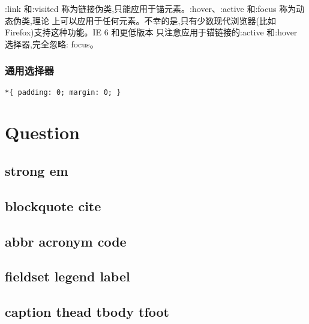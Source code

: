 \documentclass[11pt]{article}
\begin{document}
:link 和:visited 称为链接伪类,只能应用于锚元素。:hover、:active 和:focus 称为动态伪类,理论
上可以应用于任何元素。不幸的是,只有少数现代浏览器(比如 Firefox)支持这种功能。IE 6 和更低版本
只注意应用于锚链接的:active 和:hover 选择器,完全忽略: focus。
\subsubsection{通用选择器}
\label{sec-4.1.5}


\begin{verbatim}
*{ padding: 0; margin: 0; }

\end{verbatim}




\section{Question}
\label{sec-5}

\subsection{strong em}
\label{sec-5.1}

\subsection{blockquote cite}
\label{sec-5.2}

\subsection{abbr acronym code}
\label{sec-5.3}

\subsection{fieldset legend label}
\label{sec-5.4}

\subsection{caption thead tbody tfoot}
\label{sec-5.5}
\end{document}
